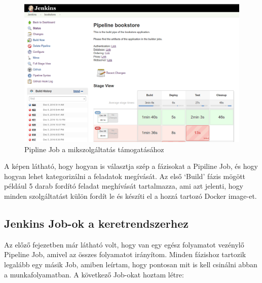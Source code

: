 \documentclass[11pt,magyar,a4paper,twoside,]{report}
\let\Oldincludegraphics\includegraphics
\renewcommand{\includegraphics}[1]{
\begin{adjustbox}{max size={\textwidth}{\textheight}}
    \Oldincludegraphics[scale=0.6]{#1}%
\end{adjustbox}
}
\begin{document}
\begin{figure}[H]
\centering
\includegraphics{img/pipeline-job.png}
\caption{Pipline Job a mikszolgáltatás támogatásához}
\end{figure}

A képen látható, hogy hogyan is választja szép a fázisokat a Pipiline
Job, és hogy hogyan lehet kategorizálni a feladatok megívását. Az első
`Build' fázis mögött például 5 darab fordító feladat meghívását
tartalmazza, ami azt jelenti, hogy minden szolgáltatást külön fordít le
és készíti el a hozzá tartozó Docker image-et.

\subsection{Jenkins Job-ok a
keretrendszerhez}\label{jenkins-job-ok-a-keretrendszerhez}

Az előző fejezetben már látható volt, hogy van egy egész folyamatot
vezénylő Pipeline Job, amivel az összes folyamatot irányítom. Minden
fázishoz tartozik legalább egy másik Job, amiben leírtam, hogy pontosan
mit is kell csinálni abban a munkafolyamatban. A következő Job-okat
hoztam létre:
\end{document}

